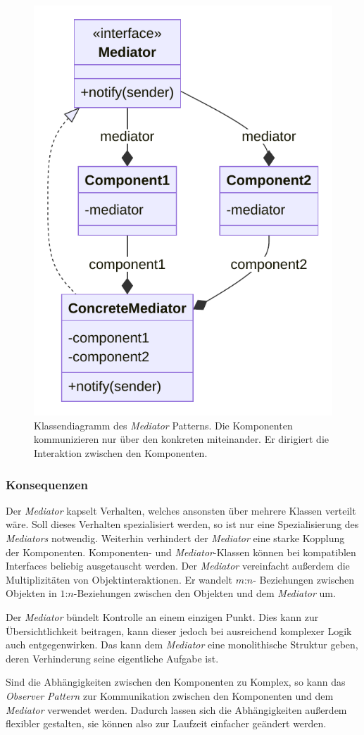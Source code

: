 \begin{figure}[!ht]
	\centering
	\includegraphics[width=0.75\linewidth]{images/patterns/mediator-class.pdf}
	\caption{Klassendiagramm des \emph{Mediator} Patterns. Die Komponenten kommunizieren nur über den konkreten  miteinander. Er dirigiert die Interaktion zwischen den Komponenten. \cite{skobeleva_mediator_2023}}
	\label{fig:mediator-class}
\end{figure}

\subsubsection*{Konsequenzen}

Der \emph{Mediator} kapselt Verhalten, welches ansonsten über mehrere Klassen verteilt wäre. Soll dieses Verhalten spezialisiert werden, so ist nur eine Spezialisierung des \emph{Mediators} notwendig. Weiterhin verhindert der \emph{Mediator} eine starke Kopplung der Komponenten. Komponenten- und \emph{Mediator}-Klassen können bei kompatiblen Interfaces beliebig ausgetauscht werden. Der \emph{Mediator} vereinfacht außerdem die Multiplizitäten von Objektinteraktionen. Er wandelt $m$:$n$- Beziehungen zwischen Objekten in $1$:$n$-Beziehungen zwischen den Objekten und dem \emph{Mediator} um.

Der \emph{Mediator} bündelt Kontrolle an einem einzigen Punkt. Dies kann zur Übersichtlichkeit beitragen, kann dieser jedoch bei ausreichend komplexer Logik auch entgegenwirken. Das kann dem \emph{Mediator} eine monolithische Struktur geben, deren Verhinderung seine eigentliche Aufgabe ist.

Sind die Abhängigkeiten zwischen den Komponenten zu Komplex, so kann das \emph{Observer Pattern} zur Kommunikation zwischen den Komponenten und dem \emph{Mediator} verwendet werden. Dadurch lassen sich die Abhängigkeiten außerdem flexibler gestalten, sie können also zur Laufzeit einfacher geändert werden. \cite{gamma_design_1995}